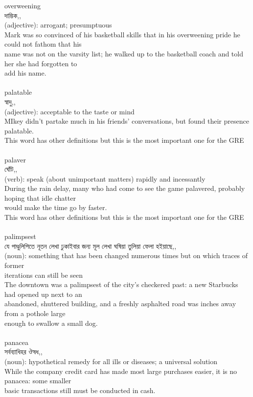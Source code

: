 \documentclass{article}
\begin{document}
{{overweening}\\
{দাম্ভিক,,}\\
{(adjective): arrogant; presumptuous\\Mark was so convinced of his basketball skills that in his overweening pride he could not fathom that his\\name was not on the varsity list; he walked up to the basketball coach and told her she had forgotten to\\add his name.\\}\\
{palatable}\\
{স্বাদু,,}\\
{(adjective): acceptable to the taste or mind\\MIkey didn't partake much in his friends' conversations, but found their presence palatable.\\This word has other definitions but this is the most important one for the GRE\\}\\
{palaver}\\
{ঘোঁট,,}\\
{(verb): speak (about unimportant matters) rapidly and incessantly\\During the rain delay, many who had come to see the game palavered, probably hoping that idle chatter\\would make the time go by faster.\\This word has other definitions but this is the most important one for the GRE\\}\\
{palimpsest}\\
{যে পাণ্ডুলিপিতে নূতন লেখা ঢুকাইবার জন্য মূল লেখা ঘষিয়া তুলিয়া ফেলা হইয়াছে,,}\\
{(noun): something that has been changed numerous times but on which traces of former\\iterations can still be seen\\The downtown was a palimpsest of the city's checkered past: a new Starbucks had opened up next to an\\abandoned, shuttered building, and a freshly asphalted road was inches away from a pothole large\\enough to swallow a small dog.\\}\\
{panacea}\\
{সর্বব্যাধিহর ঔষধ,,}\\
{(noun): hypothetical remedy for all ills or diseases; a universal solution\\While the company credit card has made most large purchases easier, it is no panacea: some smaller\\basic transactions still must be conducted in cash.\\}\\
}
\end{document}
